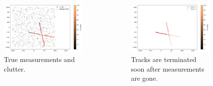 \begin{frame}
\begin{columns}
    \begin{column}{0.5\textwidth}
        \begin{figure}[ht]
            \centering
            \includegraphics[width=\linewidth]{pic/review-meas.png}
            \caption{True measurements and clutter.}
        \end{figure}
    \end{column}
    \begin{column}{0.5\textwidth}
        \begin{figure}[ht]
            \centering
            \includegraphics[width=\linewidth]{pic/review-est.png}
            \caption{Tracks are terminated soon after measurements are gone.}
        \end{figure}
    \end{column}
\end{columns}
\end{frame}

\begin{frame}
    \centering
\end{frame}
